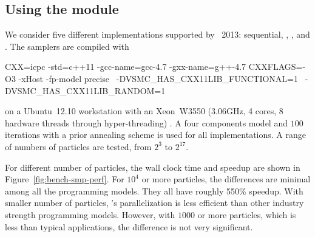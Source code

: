 \subsection{Using the \protect\smp module}
\label{sub:Using the SMP module}

We consider five different implementations supported by \icpc~2013:
sequential, \tbb, \cilk, \openmp and \cppoo{} . The
samplers are compiled with
\begin{makecode}
CXX=icpc -std=c++11 -gcc-name=gcc-4.7 -gxx-name=g++-4.7
CXXFLAGS=-O3 -xHost -fp-model precise  \
         -DVSMC_HAS_CXX11LIB_FUNCTIONAL=1  \
         -DVSMC_HAS_CXX11LIB_RANDOM=1
\end{makecode}
on a Ubuntu~12.10 workstation with an Xeon~W3550 (3.06GHz, 4 cores, 8 hardware
threads through hyper-threading) \cpu. A four components model and $100$
iterations with a prior annealing scheme is used for all implementations. A
range of numbers of particles are tested, from $2^3$ to $2^{17}$.

For different number of particles, the wall clock time and speedup are shown
in Figure~\ref{fig:bench-smp-perf}. For $10^4$ or more particles, the
differences are minimal among all the programming models. They all have
roughly 550\% speedup. With smaller number of particles, \vsmc's \cppoo
parallelization is less efficient than other industry strength programming
models. However, with $1000$ or more particles, which is less than typical
applications, the difference is not very significant.

